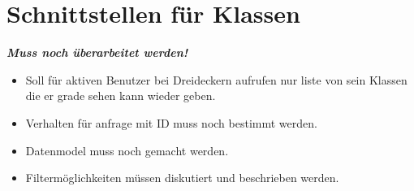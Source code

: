 \section{Schnittstellen für Klassen}
\textbf{\emph{\textcolor[rgb]{1,0,0}{Muss noch überarbeitet werden!}}}
\begin{itemize}
	\item Soll für aktiven Benutzer bei Dreideckern aufrufen nur liste von sein Klassen die er grade sehen kann wieder geben.
	\item Verhalten für anfrage mit ID muss noch bestimmt werden.
	\item Datenmodel muss noch gemacht werden.
	\item Filtermöglichkeiten müssen diskutiert und beschrieben werden.
\end{itemize}

%
%
%
%
%
